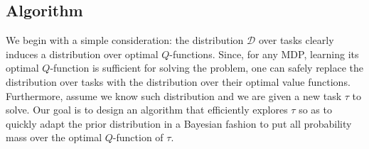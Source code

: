 \documentclass{article}
\begin{document}
\subsection{Algorithm}\label{sec:alg}

We begin with a simple consideration: the distribution $\mathcal{D}$ over tasks clearly induces a distribution over optimal $Q$-functions. Since, for any MDP, learning its optimal $Q$-function is sufficient for solving the problem, one can safely replace the distribution over tasks with the distribution over their optimal value functions. Furthermore, assume we know such distribution and we are given a new task $\tau$ to solve. Our goal is to design an algorithm that efficiently explores $\tau$ so as to quickly adapt the prior distribution in a Bayesian fashion to put all probability mass over the optimal $Q$-function of $\tau$.
\end{document}
